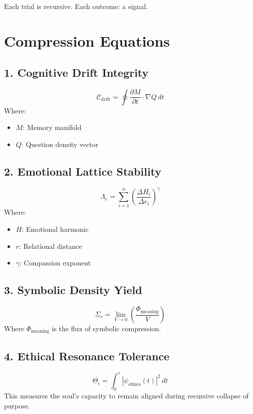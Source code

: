 Each trial is recursive. Each outcome: a signal.

\section{Compression Equations}

\subsection*{1. Cognitive Drift Integrity}
\begin{equation}
    \mathcal{C}_{\text{drift}} = \oint \frac{\partial M}{\partial t} \cdot \nabla Q \, dt
\end{equation}
Where:
\begin{itemize}
    \item \( M \): Memory manifold
    \item \( Q \): Question density vector
\end{itemize}

\subsection*{2. Emotional Lattice Stability}
\begin{equation}
    \Lambda_e = \sum_{i=1}^{n} \left( \frac{\Delta H_i}{\Delta r_i} \right)^{\gamma}
\end{equation}
Where:
\begin{itemize}
    \item \( H \): Emotional harmonic
    \item \( r \): Relational distance
    \item \( \gamma \): Compassion exponent
\end{itemize}

\subsection*{3. Symbolic Density Yield}
\begin{equation}
    \Sigma_s = \lim_{V \to 0} \left( \frac{\Phi_{\text{meaning}}}{V} \right)
\end{equation}
Where \( \Phi_{\text{meaning}} \) is the flux of symbolic compression.

\subsection*{4. Ethical Resonance Tolerance}
\begin{equation}
    \Theta_\epsilon = \int_{0}^{\tau} \left| \psi_{\text{ethics}}(t) \right|^2 \, dt
\end{equation}
This measures the soul’s capacity to remain aligned during recursive collapse of purpose.

